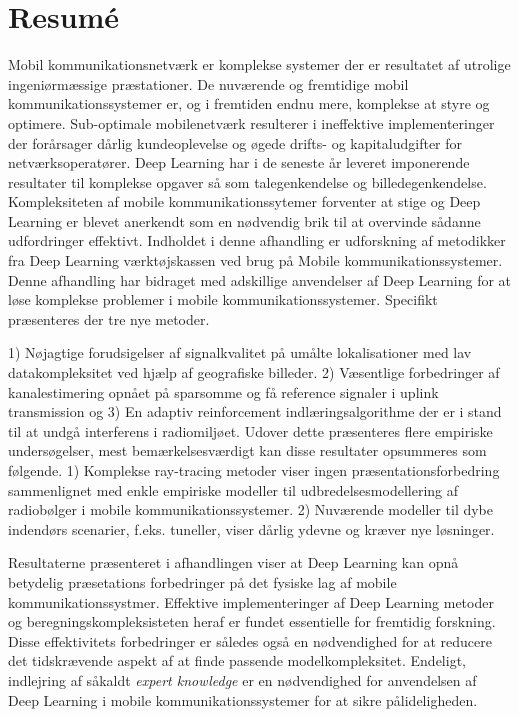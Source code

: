 \chapter*{Resumé}
Mobil kommunikationsnetværk er komplekse systemer der er resultatet af utrolige ingeniørmæssige præstationer. De nuværende og fremtidige mobil kommunikationssystemer er, og i fremtiden endnu mere, komplekse at styre og optimere. Sub-optimale mobilenetværk resulterer i ineffektive implementeringer der forårsager dårlig kundeoplevelse og øgede drifts- og kapitaludgifter for netværksoperatører. Deep Learning har i de seneste år leveret imponerende resultater til komplekse opgaver så som talegenkendelse og billedegenkendelse. Kompleksiteten af mobile kommunikationssytemer forventer at stige og Deep Learning er blevet anerkendt som en nødvendig brik til at overvinde sådanne udfordringer effektivt. Indholdet i denne afhandling er udforskning af metodikker fra Deep Learning værktøjskassen ved brug på Mobile kommunikationssystemer. Denne afhandling har bidraget med adskillige anvendelser af Deep Learning for at løse komplekse problemer i mobile kommunikationssystemer. Specifikt præsenteres der tre nye metoder.

1) Nøjagtige forudsigelser af signalkvalitet på umålte lokalisationer med lav datakompleksitet ved hjælp af geografiske billeder. 2) Væsentlige forbedringer af kanalestimering opnået på sparsomme og få reference signaler i uplink transmission og 3) En adaptiv reinforcement indlæringsalgorithme der er i stand til at undgå interferens i radiomiljøet. Udover dette præsenteres flere empiriske undersøgelser, mest bemærkelsesværdigt kan disse resultater opsummeres som følgende. 1) Komplekse ray-tracing metoder viser ingen præsentationsforbedring sammenlignet med enkle empiriske modeller til udbredelsesmodellering af radiobølger i mobile kommunikationssystemer. 2) Nuværende modeller til dybe indendørs scenarier, f.eks. tuneller, viser dårlig ydevne og kræver nye løsninger.

Resultaterne præsenteret i afhandlingen viser at Deep Learning kan opnå betydelig præsetations forbedringer på det fysiske lag af mobile kommunikationssystmer. Effektive implementeringer af Deep Learning metoder og beregningskompleksisteten heraf er fundet essentielle for fremtidig forskning. Disse effektivitets forbedringer er således også en nødvendighed for at reducere det tidskrævende aspekt af at finde passende modelkompleksitet. Endeligt, indlejring af såkaldt \emph{expert knowledge} er en nødvendighed for anvendelsen af Deep Learning i mobile kommunikationssystemer for at sikre pålideligheden.